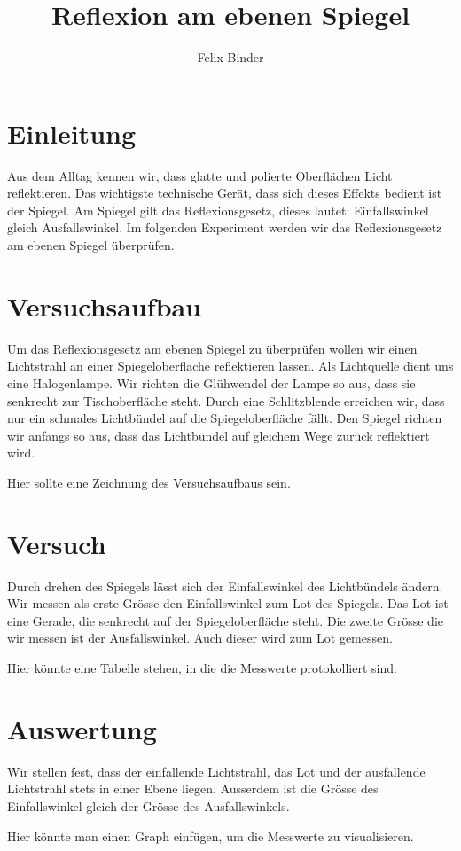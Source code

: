 \documentclass[11pt,a4paper]{article}
\author{Felix Binder}
\title{Reflexion am ebenen Spiegel}
\begin{document}
\maketitle


\section{Einleitung}
Aus dem Alltag kennen wir, dass glatte und polierte Oberflächen Licht reflektieren.
Das wichtigste technische Gerät, dass sich dieses Effekts bedient ist der Spiegel.
Am Spiegel gilt das Reflexionsgesetz, dieses lautet: Einfallswinkel gleich Ausfallswinkel.
Im folgenden Experiment werden wir das Reflexionsgesetz am ebenen Spiegel überprüfen.


\section{Versuchsaufbau}
Um das Reflexionsgesetz am ebenen Spiegel zu überprüfen wollen wir einen Lichtstrahl an
einer Spiegeloberfläche reflektieren lassen.
Als Lichtquelle dient uns eine Halogenlampe. Wir richten die Glühwendel der Lampe so aus,
dass sie senkrecht zur Tischoberfläche steht.
Durch eine Schlitzblende erreichen wir, dass nur ein schmales Lichtbündel auf die Spiegeloberfläche fällt.
Den Spiegel richten wir anfangs so aus, dass das Lichtbündel auf gleichem Wege zurück reflektiert wird.
\begin{center}
Hier sollte eine Zeichnung des Versuchsaufbaus sein.
\end{center}

\section{Versuch}
Durch drehen des Spiegels lässt sich der Einfallswinkel des Lichtbündels ändern. Wir messen als erste Grösse den Einfallswinkel
zum Lot des Spiegels. Das Lot ist eine Gerade, die senkrecht auf der Spiegeloberfläche steht.
Die zweite Grösse die wir messen ist der Ausfallswinkel. Auch dieser wird zum Lot gemessen. 
\begin{center}
	Hier könnte eine Tabelle stehen, in die die Messwerte protokolliert sind.
\end{center}


\section{Auswertung}
Wir stellen fest,
dass der einfallende Lichtstrahl, das Lot und der ausfallende Lichtstrahl stets in einer Ebene liegen.
Ausserdem ist die Grösse des Einfallswinkel gleich der Grösse des Ausfallswinkels.
\begin{center}
	Hier könnte man einen Graph einfügen, um die Messwerte zu visualisieren. 
\end{center}
\end{document}

